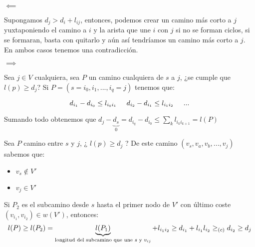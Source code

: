 \documentclass[openany]{book}
\begin{document}
\begin{demonstration}
    $ \impliedby $

    Supongamos $ d_j > d_i + l_{ij} $, entonces, podemos crear un camino más corto a $ j $ yuxtaponiendo el camino a $ i $ y la arista que une $ i $ con $ j $ si no se forman ciclos, si se formaran, basta con quitarlo y aún así tendríamos un camino más corto a $ j $. En ambos casos tenemos una contradicción.
    
    $ \implies $

    Sea $ j \in V $ cualquiera, sea $ P $ un camino cualquiera de $ s $ a $ j $, ¿se cumple que $ l(p) \geq d_j $? Si $ P = (s = i_0,i_1,...,i_{q}=j) $ tenemos que:

    $$ d_{i_1}-d_{i_0} \leq l_{i_0i_1} \hspace{5mm} d_{i_2}-d_{i_1} \leq l_{i_1i_2} \hspace{5mm} ...$$

    Sumando todo obtenemos que $d_j-\underbrace{d_{s}}_{0} = d_{i_q}-d_{i_0} \leq \sum\limits_{k}^{}l_{i_{k}i_{k+1}} = l(P)$

\end{demonstration}



\begin{demonstration}
    Sea $ P $ camino entre $ s $ y $ j  $, ¿ $ l(p)\geq d_j $ ? De este camino $ (v_{s},v_{a},v_{b},...,v_{j}) $ sabemos que:
    \begin{itemize}
        \item $ v_{s} \not \in V' $
        \item $ v_j \in V' $
    \end{itemize}
    Si $ P_{2} $ es el subcamino desde $ s $ hasta el primer nodo de $ V' $ con último coste $ (v_{i_1},v_{i_2}) \in w(V') $, entonces:
    $$ l(P) \geq l(P_2) =\underbrace{l(P_1)}_{\text{longitud del subcamino que une $ s $ y $ v_{ij} $}}+l_{i_1i_2} \geq d_{i_1} + l_{i_1}l_{i_2} \geq _{(c)} d_{i_2} \geq d_j$$
\end{demonstration}




\end{document}
